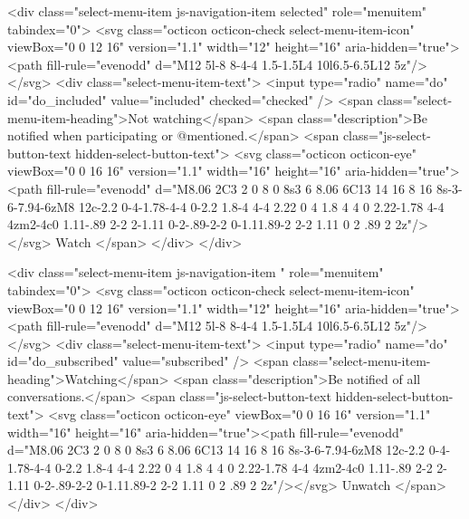                 <div class="select-menu-item js-navigation-item selected" role="menuitem" tabindex="0">
                  <svg class="octicon octicon-check select-menu-item-icon" viewBox="0 0 12 16" version="1.1" width="12" height="16" aria-hidden="true"><path fill-rule="evenodd" d="M12 5l-8 8-4-4 1.5-1.5L4 10l6.5-6.5L12 5z"/></svg>
                  <div class="select-menu-item-text">
                    <input type="radio" name="do" id="do_included" value="included" checked="checked" />
                    <span class="select-menu-item-heading">Not watching</span>
                    <span class="description">Be notified when participating or @mentioned.</span>
                    <span class="js-select-button-text hidden-select-button-text">
                      <svg class="octicon octicon-eye" viewBox="0 0 16 16" version="1.1" width="16" height="16" aria-hidden="true"><path fill-rule="evenodd" d="M8.06 2C3 2 0 8 0 8s3 6 8.06 6C13 14 16 8 16 8s-3-6-7.94-6zM8 12c-2.2 0-4-1.78-4-4 0-2.2 1.8-4 4-4 2.22 0 4 1.8 4 4 0 2.22-1.78 4-4 4zm2-4c0 1.11-.89 2-2 2-1.11 0-2-.89-2-2 0-1.11.89-2 2-2 1.11 0 2 .89 2 2z"/></svg>
                      Watch
                    </span>
                  </div>
                </div>

                <div class="select-menu-item js-navigation-item " role="menuitem" tabindex="0">
                  <svg class="octicon octicon-check select-menu-item-icon" viewBox="0 0 12 16" version="1.1" width="12" height="16" aria-hidden="true"><path fill-rule="evenodd" d="M12 5l-8 8-4-4 1.5-1.5L4 10l6.5-6.5L12 5z"/></svg>
                  <div class="select-menu-item-text">
                    <input type="radio" name="do" id="do_subscribed" value="subscribed" />
                    <span class="select-menu-item-heading">Watching</span>
                    <span class="description">Be notified of all conversations.</span>
                    <span class="js-select-button-text hidden-select-button-text">
                      <svg class="octicon octicon-eye" viewBox="0 0 16 16" version="1.1" width="16" height="16" aria-hidden="true"><path fill-rule="evenodd" d="M8.06 2C3 2 0 8 0 8s3 6 8.06 6C13 14 16 8 16 8s-3-6-7.94-6zM8 12c-2.2 0-4-1.78-4-4 0-2.2 1.8-4 4-4 2.22 0 4 1.8 4 4 0 2.22-1.78 4-4 4zm2-4c0 1.11-.89 2-2 2-1.11 0-2-.89-2-2 0-1.11.89-2 2-2 1.11 0 2 .89 2 2z"/></svg>
                        Unwatch
                    </span>
                  </div>
                </div>

